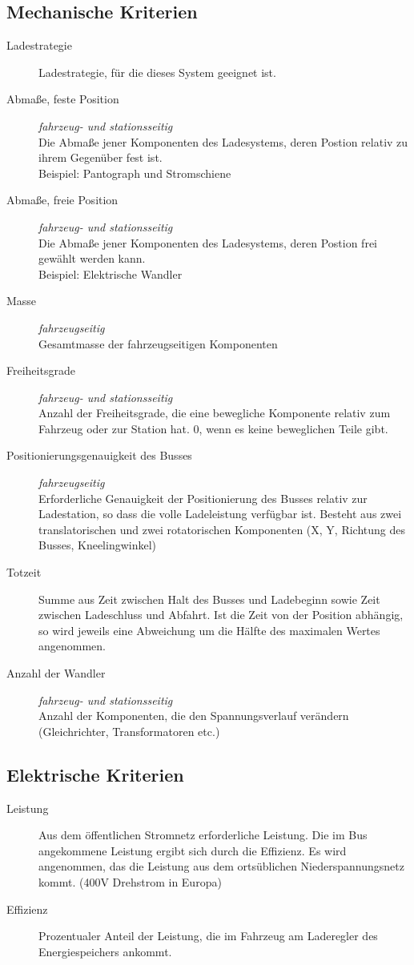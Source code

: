 \subsection{Mechanische Kriterien}
\begin{description}
	\item [Ladestrategie] Ladestrategie, für die dieses System geeignet ist.
	\item [Abmaße, feste Position] \emph{fahrzeug- und stationsseitig}\\
	Die Abmaße jener Komponenten des Ladesystems, deren Postion relativ zu ihrem Gegenüber fest ist.\\
	Beispiel: Pantograph und Stromschiene
	\item [Abmaße, freie Position] \emph{fahrzeug- und stationsseitig}\\
	Die Abmaße jener Komponenten des Ladesystems, deren Postion frei gewählt werden kann.\\
	Beispiel: Elektrische Wandler
	\item [Masse] \emph{fahrzeugseitig}\\
	Gesamtmasse der fahrzeugseitigen Komponenten
	\item [Freiheitsgrade] \emph{fahrzeug- und stationsseitig}\\
	Anzahl der Freiheitsgrade, die eine bewegliche Komponente relativ zum Fahrzeug oder zur Station hat. 0, wenn es keine beweglichen Teile gibt.
	\item [Positionierungsgenauigkeit des Busses] \emph{fahrzeugseitig} \\
	Erforderliche Genauigkeit der Positionierung des Busses relativ zur Ladestation, so dass die volle Ladeleistung verfügbar ist. Besteht aus zwei translatorischen und zwei rotatorischen Komponenten (X, Y, Richtung des Busses, Kneelingwinkel)
	\item [Totzeit]
	Summe aus Zeit zwischen Halt des Busses und Ladebeginn sowie Zeit zwischen Ladeschluss und Abfahrt. Ist die Zeit von der Position abhängig, so wird jeweils eine Abweichung um die Hälfte des maximalen Wertes angenommen.
	\item [Anzahl der Wandler] \emph{fahrzeug- und stationsseitig}\\
	Anzahl der Komponenten, die den Spannungsverlauf verändern (Gleichrichter, Transformatoren etc.)
\end{description}

\subsection{Elektrische Kriterien}
\begin{description}
	\item [Leistung]
	Aus dem öffentlichen Stromnetz erforderliche Leistung. Die im Bus angekommene Leistung ergibt sich durch die Effizienz. Es wird angenommen, das die Leistung aus dem ortsüblichen Niederspannungsnetz kommt. (400V Drehstrom in Europa)
	\item [Effizienz]
	Prozentualer Anteil der Leistung, die im Fahrzeug am Laderegler des Energiespeichers ankommt.		
\end{description}

